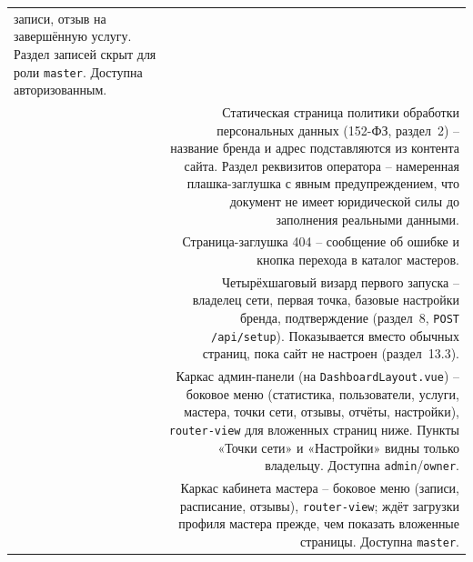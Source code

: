 \begin{xltabular}{\textwidth}{M D}
  записи, отзыв на завершённую услугу. Раздел записей скрыт для роли
  \texttt{master}. Доступна авторизованным. \\
 & Статическая страница политики обработки
  персональных данных (152-ФЗ, раздел~2) -- название бренда и адрес
  подставляются из контента сайта. Раздел реквизитов оператора --
  намеренная плашка-заглушка с явным предупреждением, что документ не
  имеет юридической силы до заполнения реальными данными. \\
 & Страница-заглушка 404 -- сообщение об ошибке
  и кнопка перехода в каталог мастеров. \\
 & Четырёхшаговый визард первого запуска --
  владелец сети, первая точка, базовые настройки бренда, подтверждение
  (раздел~8, \texttt{POST /api/setup}). Показывается вместо обычных
  страниц, пока сайт не настроен (раздел~13.3). \\
 & Каркас админ-панели (на \texttt{DashboardLayout.vue}) --
  боковое меню (статистика, пользователи, услуги, мастера, точки сети,
  отзывы, отчёты, настройки), \texttt{router-view} для вложенных страниц
  ниже. Пункты «Точки сети» и «Настройки» видны только владельцу.
  Доступна \texttt{admin}/\texttt{owner}. \\
 & Каркас кабинета мастера -- боковое меню
  (записи, расписание, отзывы), \texttt{router-view}; ждёт загрузки
  профиля мастера прежде, чем показать вложенные страницы. Доступна
  \texttt{master}. \\
\end{xltabular}

